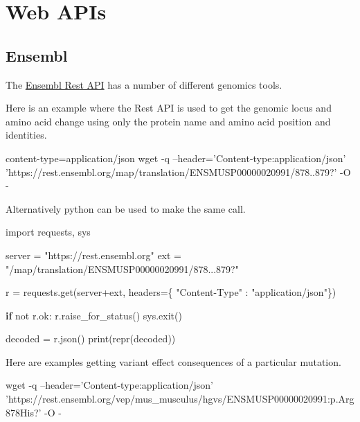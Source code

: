 \documentclass[]{book}
\newenvironment{Shaded}{\begin{snugshade}}{\end{snugshade}}
\newcommand{\KeywordTok}[1]{\textcolor[rgb]{0.13,0.29,0.53}{\textbf{#1}}}
\newcommand{\StringTok}[1]{\textcolor[rgb]{0.31,0.60,0.02}{#1}}
\newcommand{\FunctionTok}[1]{\textcolor[rgb]{0.00,0.00,0.00}{#1}}
\newcommand{\ExtensionTok}[1]{#1}
\newcommand{\NormalTok}[1]{#1}
\begin{document}
\chapter{Web APIs}\label{apis}

\section{Ensembl}\label{ensembl}

The \href{https://rest.ensembl.org/}{Ensembl Rest API} has a number of
different genomics tools.

Here is an example where the Rest API is used to get the genomic locus
and amino acid change using only the protein name and amino acid
position and identities.

\begin{Shaded}
\begin{Highlighting}[]
\ExtensionTok{content-type}\NormalTok{=application/json}
\FunctionTok{wget}\NormalTok{ -q --header=}\StringTok{'Content-type:application/json'} \StringTok{'https://rest.ensembl.org/map/translation/ENSMUSP00000020991/878..879?'}\NormalTok{  -O -}
\end{Highlighting}
\end{Shaded}

Alternatively python can be used to make the same call.

\begin{Shaded}
\begin{Highlighting}[]
\ExtensionTok{import}\NormalTok{ requests, sys}
 
\ExtensionTok{server}\NormalTok{ = }\StringTok{"https://rest.ensembl.org"}
\ExtensionTok{ext}\NormalTok{ = }\StringTok{"/map/translation/ENSMUSP00000020991/878...879?"}
 
\ExtensionTok{r}\NormalTok{ = requests.get(server+ext, headers=\{ }\StringTok{"Content-Type"}\NormalTok{ : }\StringTok{"application/json"}\NormalTok{\})}
 
\KeywordTok{if} \ExtensionTok{not}\NormalTok{ r.ok:}
  \ExtensionTok{r.raise_for_status}\NormalTok{()}
  \ExtensionTok{sys.exit}\NormalTok{()}
 
\ExtensionTok{decoded}\NormalTok{ = r.json()}
\ExtensionTok{print}\NormalTok{(repr(decoded))}
\end{Highlighting}
\end{Shaded}

Here are examples getting variant effect consequences of a particular
mutation.

\begin{Shaded}
\begin{Highlighting}[]
\FunctionTok{wget}\NormalTok{ -q --header=}\StringTok{'Content-type:application/json'} \StringTok{'https://rest.ensembl.org/vep/mus_musculus/hgvs/ENSMUSP00000020991:p.Arg878His?'}\NormalTok{  -O -}
\end{Highlighting}
\end{Shaded}
\end{document}
